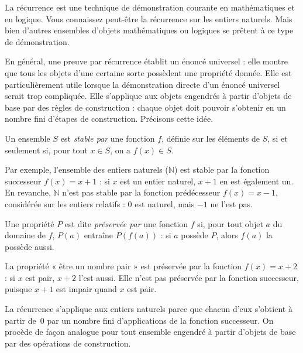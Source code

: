 \documentclass[../../../include/open-logic-section]{subfiles}
\begin{document}


\begin{explain}
La récurrence est une technique de démonstration courante en
mathématiques et en logique. Vous connaissez peut-être la récurrence
sur les entiers naturels. Mais bien d'autres ensembles d'objets
mathématiques ou logiques se prêtent à ce type de démonstration.

En général, une preuve par récurrence établit un énoncé universel :
elle montre que tous les objets d'une certaine sorte possèdent une
propriété donnée. Elle est particulièrement utile lorsque la
démonstration directe d'un énoncé universel serait trop compliquée.
Elle s'applique aux objets engendrés à partir d'objets de base par des
règles de construction : chaque objet doit pouvoir s'obtenir en un
nombre fini d'étapes de construction. Précisons cette idée.
\end{explain}

\begin{defn}
Un ensemble $S$ est \emph{stable par} une fonction $f$, définie sur
les éléments de $S$, si et seulement si, pour tout $x\in S$, on a
$f(x)\in S$.
\end{defn}

\begin{explain}
Par exemple, l'ensemble des entiers naturels ($\mathbb{N}$) est stable
par la fonction successeur $f(x)=x+1$ : si $x$ est un entier naturel,
$x+1$ en est également un. En revanche, $\mathbb{N}$ n'est pas stable
par la fonction prédécesseur $f(x)=x-1$, considérée sur les entiers
relatifs : $0$ est naturel, mais $-1$ ne l'est pas.
\end{explain}

\begin{defn}
Une propriété $P$ est dite \emph{préservée par} une fonction $f$ si,
pour tout objet $a$ du domaine de $f$, $P(a)$ entraîne $P(f(a))$ :
si $a$ possède $P$, alors $f(a)$ la possède aussi.
\end{defn}

\begin{explain}
La propriété « être un nombre pair » est préservée par la fonction
$f(x)=x+2$ : si $x$ est pair, $x+2$ l'est aussi. Elle n'est pas
préservée par la fonction successeur, puisque $x+1$ est impair quand
$x$ est pair.

La récurrence s'applique aux entiers naturels parce que chacun d'eux
s'obtient à partir de~$0$ par un nombre fini d'applications de la
fonction successeur. On procède de façon analogue pour tout ensemble
engendré à partir d'objets de base par des opérations de construction.
\end{explain}
\end{document}
